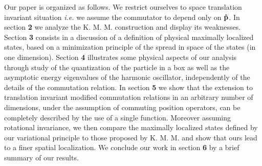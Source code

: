 \documentclass[a4paper,10pt]{article}
\newcommand{\p}{\mbox{\rm{\bf \^ p}}}
\newcommand{\KMM}{K. M. M. }
\begin{document}
Our paper is organized as follows. We restrict ourselves to space
translation invariant situation {\it i.e.} we assume the
commutator to depend only on $\p$. In section {\bf 2} we analyze
the \KMM construction and display its weaknesses. Section {\bf 3}
consists in a discussion of a definition of physical maximally
localized states, based on a minimization principle of the spread
in space of the states (in one dimension). Section {\bf 4}
illustrates some physical aspects of our analysis through study of
the quantization of the particle in a box as well as the
asymptotic energy eigenvalues of the harmonic oscillator,
independently of the details of the commutation relation. In
section {\bf 5} we show that the extension to translation
invariant modified commutation relations in an arbitrary number of
dimensions, under the assumption of commuting position operators,
can be completely described by the use of a single function.
Moreover assuming rotational invariance, we then compare the
maximally localized states defined by our variational principle to
those proposed by \KMM and show that ours lead to a finer spatial
localization. We conclude our work in section {\bf 6} by a brief
summary of our results.
\end{document}
